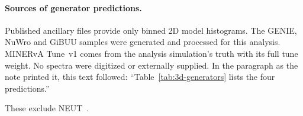 \paragraph{Sources of generator predictions.} Published ancillary files provide only binned 2D model histograms. The GENIE, NuWro and GiBUU samples were generated and processed for this analysis. MINERvA Tune~v1 comes from the analysis simulation's truth with its full tune weight. No spectra were digitized or externally supplied. In the paragraph as the note printed it, this text followed: ``Table~\ref{tab:3d-generators} lists the four predictions.''\par These exclude NEUT~\cite{Hayato:2009zz}.

